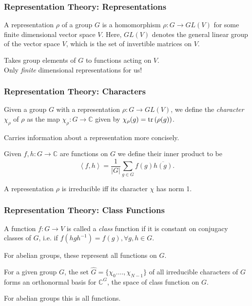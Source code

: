 \documentclass{beamer}
\newcommand{\abs}[1]{\left\lvert #1 \right\rvert}
\newcommand{\inner}[2]{\left\langle #1, #2 \right\rangle}
\newcommand{\tr}[1]{\textnormal{tr}\left(#1\right)}
\newcommand{\conj}[1]{\overline{#1}}
\newcommand{\bb}[1]{\mathbb{#1}}
\begin{document}
\begin{frame}
\frametitle{Representation Theory: Representations}
        \begin{definition}[Representation]\label{def:representation}
            A representation $\rho$ of a group $G$ is a homomorphism $\rho : G \to GL(V)$ for some finite dimensional vector space $V$. 
            Here, $GL(V)$ denotes the general linear group of the vector space $V$, which is the set of invertible matrices on $V$.
        \end{definition}
        Takes group elements of $G$ to functions acting on $V$.\\
        Only \textit{finite} dimensional representations for us!
\end{frame}

\begin{frame}
\frametitle{Representation Theory: Characters}
        \begin{definition}[Character]\label{def:character}
            Given a group $G$ with a representation $\rho: G \to GL(V)$, we define the \textit{character} $\chi_\rho$ of $\rho$ as the map $\chi_\rho: G \to \bb{C}$ given by $\chi_\rho (g) = \tr{\rho(g)}$.
        \end{definition}
        Carries information about a representation more concisely.
    \begin{definition}
        Given $f, h : G \to \bb{C}$ are functions on $G$ we define their inner product to be
        $$\inner{f}{h} = \frac{1}{\abs{G}}\sum_{g \in G} f(g) \conj{h(g)}.$$
    \end{definition}
        \begin{theorem}\label{thm:irreducible_characters_are_normal}
            A representation $\rho$ is irreducible iff its character $\chi$ has norm 1.
        \end{theorem}
\end{frame}

\begin{frame}
\frametitle{Representation Theory: Class Functions}
        \begin{definition}\label{def:class_function}
            A function $f : G \to V$ is called a \textit{class} function if it is constant on conjugacy classes of $G$, i.e. if $f(hgh^{-1}) = f(g), \forall g, h \in G$.
        \end{definition}
        For abelian groups, these represent all functions on $G$.
        \begin{theorem}\label{thm:irr_characters}
            For a given group $G$, the set $\hat{G} = \{\chi_0. \dots, \chi_{N-1}\}$ of all irreducible characters of $G$ forms an orthonormal basis for $\bb{C}^G$, the space of class function on $G$.
        \end{theorem}
        For abelian groups this is all functions.
\end{frame}
\end{document}
